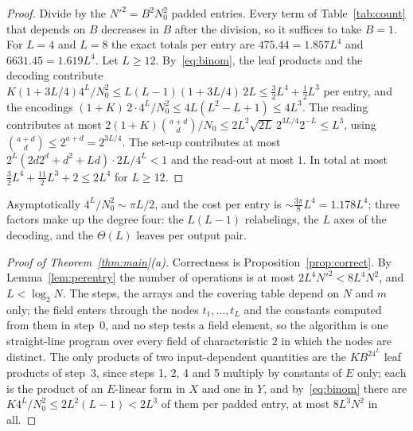 \documentclass[11pt]{article}
\theoremstyle{definition}
\theoremstyle{remark}
\newcommand{\Nz}{N_0}
\begin{document}
\begin{proof}
Divide by the $N'^2=B^2\Nz^2$ padded entries. Every term of Table~\ref{tab:count} that depends on $B$ decreases in $B$ after the division, so it suffices to take $B=1$. For $L=4$ and $L=8$ the exact totals per entry are $475.44=1.857L^4$ and $6631.45=1.619L^4$. Let $L\ge12$. By~\eqref{eq:binom}, the leaf products and the decoding contribute $K(1+3L/4)4^L/\Nz^2\le L(L-1)(1+3L/4)\,2L\le\frac32L^4+\frac12L^3$ per entry, and the encodings $(1+K)\,2\cdot4^L/\Nz^2\le4L(L^2-L+1)\le4L^3$. The reading contributes at most $2(1+K)\binom{a+d}d/\Nz\le2L^2\sqrt{2L}\,2^{3L/4}2^{-L}\le L^3$, using $\binom{a+d}d\le2^{a+d}=2^{3L/4}$. The set-up contributes at most $2^L(2d2^d+d^2+Ld)\cdot2L/4^L<1$ and the read-out at most $1$. In total at most $\frac32L^4+\frac{11}2L^3+2\le2L^4$ for $L\ge12$.
\end{proof}

Asymptotically $4^L/\Nz^2\sim\pi L/2$, and the cost per entry is $\sim\frac{3\pi}8L^4=1.178L^4$; three factors make up the degree four: the $L(L-1)$ relabelings, the $L$ axes of the decoding, and the $\Theta(L)$ leaves per output pair.

\begin{proof}[Proof of Theorem~\ref{thm:main}(a)]
Correctness is Proposition~\ref{prop:correct}. By Lemma~\ref{lem:perentry} the number of operations is at most $2L^4N'^2<8L^4N^2$, and $L<\log_2N$. The steps, the arrays and the covering table depend on $N$ and $m$ only; the field enters through the nodes $t_1,\dots,t_L$ and the constants computed from them in step~0, and no step tests a field element, so the algorithm is one straight-line program over every field of characteristic $2$ in which the nodes are distinct. The only products of two input-dependent quantities are the $KB^24^L$ leaf products of step~3, since steps 1, 2, 4 and 5 multiply by constants of $E$ only; each is the product of an $E$-linear form in $X$ and one in $Y$, and by~\eqref{eq:binom} there are $K4^L/\Nz^2\le2L^2(L-1)<2L^3$ of them per padded entry, at most $8L^3N^2$ in all.
\end{proof}
\end{document}
